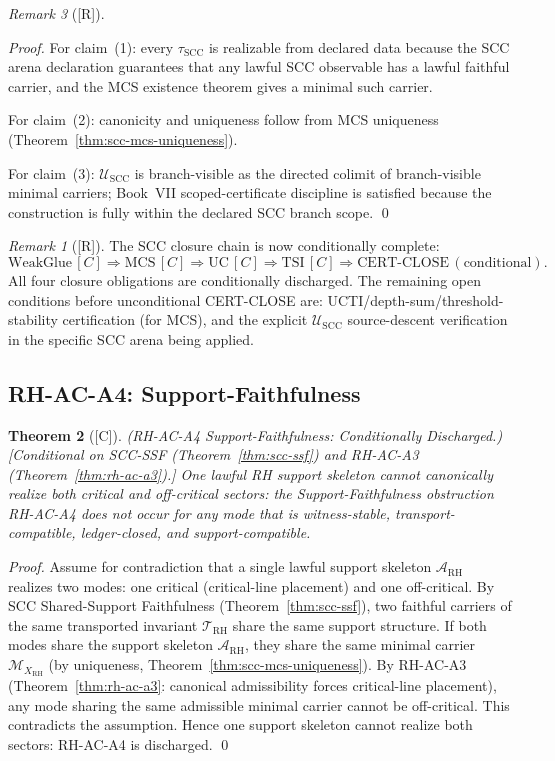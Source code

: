 \documentclass[12pt,oneside]{amsbook}
\theoremstyle{plain}
\newtheorem{theorem}{Theorem}[section]
\theoremstyle{definition}
\theoremstyle{remark}
\newtheorem{remark}[theorem]{Remark}
\newcommand{\status}[1]{\textup{[#1]}}
\begin{document}
\begin{remark}[\status{R}]
\begin{proof}
For claim~(1): every $\tau_{\mathrm{SCC}}$ is realizable from
declared data because the SCC arena declaration guarantees that
any lawful SCC observable has a lawful faithful carrier, and the
MCS existence theorem gives a minimal such carrier.

For claim~(2): canonicity and uniqueness follow from MCS uniqueness
(Theorem~\ref{thm:scc-mcs-uniqueness}).

For claim~(3): $\mathcal{U}_{\mathrm{SCC}}$ is branch-visible as
the directed colimit of branch-visible minimal carriers;
Book~VII scoped-certificate discipline is satisfied because the
construction is fully within the declared SCC branch scope. \qed
\end{proof}

\begin{remark}[\status{R}]
The SCC closure chain is now conditionally complete:
\[
 \mathrm{WeakGlue}\,[C]
 \Rightarrow \mathrm{MCS}\,[C]
 \Rightarrow \mathrm{UC}\,[C]
 \Rightarrow \mathrm{TSI}\,[C]
 \Rightarrow \mathrm{CERT\text{-}CLOSE\,(conditional)}.
\]
All four closure obligations are conditionally discharged.
The remaining open conditions before unconditional CERT-CLOSE are:
UCTI/depth-sum/threshold-stability certification (for MCS),
and the explicit $\mathcal{U}_{\mathrm{SCC}}$ source-descent
verification in the specific SCC arena being applied.
\end{remark}

\subsection{RH-AC-A4: Support-Faithfulness}

\begin{theorem}[\status{C}]\label{thm:rh-ac-a4}
\textup{(RH-AC-A4 Support-Faithfulness: Conditionally Discharged.)}
\textup{[Conditional on SCC-SSF (Theorem~\ref{thm:scc-ssf}) and
RH-AC-A3 (Theorem~\ref{thm:rh-ac-a3}).]}
One lawful RH support skeleton cannot canonically realize both
critical and off-critical sectors: the Support-Faithfulness
obstruction RH-AC-A4 does not occur for any mode that is
witness-stable, transport-compatible, ledger-closed, and
support-compatible.
\end{theorem}

\begin{proof}
Assume for contradiction that a single lawful support skeleton
$\mathcal{A}_{\mathrm{RH}}$ realizes two modes: one critical
(critical-line placement) and one off-critical. By SCC Shared-Support
Faithfulness (Theorem~\ref{thm:scc-ssf}), two faithful carriers
of the same transported invariant $\mathcal{T}_{\mathrm{RH}}$
share the same support structure. If both modes share the support
skeleton $\mathcal{A}_{\mathrm{RH}}$, they share the same
minimal carrier $\mathcal{M}_{X_{\mathrm{RH}}}$ (by uniqueness,
Theorem~\ref{thm:scc-mcs-uniqueness}). By RH-AC-A3
(Theorem~\ref{thm:rh-ac-a3}: canonical admissibility forces
critical-line placement), any mode sharing the same admissible
minimal carrier cannot be off-critical. This contradicts the
assumption. Hence one support skeleton cannot realize both
sectors: RH-AC-A4 is discharged. \qed
\end{proof}


\end{remark}
\end{document}
